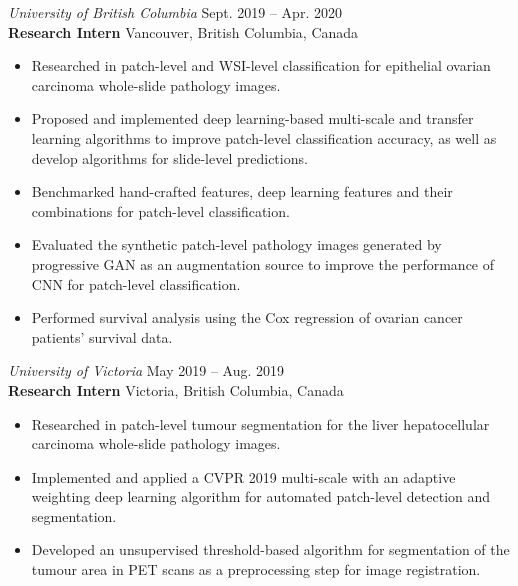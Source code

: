 \documentclass[12pt]{res} %
\begin{document}
\begin{resume}
\begin{itemize}
\end{itemize}


\textit{University of British Columbia} \hfill Sept. 2019 -- Apr. 2020 \\
\textbf{Research Intern} \hfill Vancouver, British Columbia, Canada
\begin{itemize} \itemsep -2pt %
\item Researched in patch-level and WSI-level classification for epithelial ovarian carcinoma whole-slide pathology images.
\item Proposed and implemented deep learning-based multi-scale and transfer learning algorithms to improve patch-level classification accuracy, as well as develop algorithms for slide-level predictions. 
\item Benchmarked hand-crafted features, deep learning features and their combinations for patch-level classification.
\item Evaluated the synthetic patch-level pathology images generated by progressive GAN as an augmentation source to improve the performance of CNN for patch-level classification. 
\item Performed survival analysis using the Cox regression of ovarian cancer patients' survival data.
\end{itemize}

\textit{University of Victoria} \hfill May 2019 -- Aug. 2019 \\
\textbf{Research Intern} \hfill Victoria, British Columbia, Canada
\begin{itemize} \itemsep -2pt %
\item Researched in patch-level tumour segmentation for the liver hepatocellular carcinoma whole-slide pathology images. 
\item Implemented and applied a CVPR 2019 multi-scale with an adaptive weighting deep learning algorithm for automated patch-level detection and segmentation.
\item Developed an unsupervised threshold-based algorithm for segmentation of the tumour area in PET scans as a preprocessing step for image registration. 
\end{itemize}






\end{resume}
\end{document}

